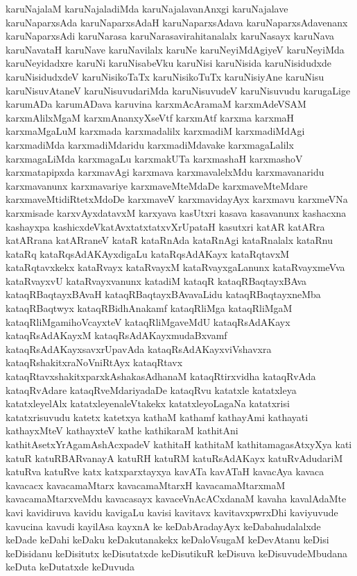 {karuNajalaM
karuNajaladiMda
karuNajalavanAnxgi
karuNajalave
karuNaparxsAda
karuNaparxsAdaH
karuNaparxsAdava
karuNaparxsAdavenanx
karuNaparxsAdi
karuNarasa
karuNarasavirahitanalalx
karuNasayx
karuNava
karuNavataH
karuNave
karuNavilalx
karuNe
karuNeyiMdAgiyeV
karuNeyiMda
karuNeyidadxre
karuNi
karuNisabeVku
karuNisi
karuNisida
karuNisidudxde
karuNisidudxdeV
karuNisikoTaTx
karuNisikoTuTx
karuNisiyAne
karuNisu
karuNisuvAtaneV
karuNisuvudariMda
karuNisuvudeV
karuNisuvudu
karugaLige
karumADa
karumADava
karuvina
karxmAcAramaM
karxmAdeVSAM
karxmAlilxMgaM
karxmAnanxyXseVtf
karxmAtf
karxma
karxmaH
karxmaMgaLuM
karxmada
karxmadalilx
karxmadiM
karxmadiMdAgi
karxmadiMda
karxmadiMdaridu
karxmadiMdavake
karxmagaLalilx
karxmagaLiMda
karxmagaLu
karxmakUTa
karxmashaH
karxmashoV
karxmatapipxda
karxmavAgi
karxmava
karxmavalelxMdu
karxmavanaridu
karxmavanunx
karxmavariye
karxmaveMteMdaDe
karxmaveMteMdare
karxmaveMtidiRtetxMdoDe
karxmaveV
karxmavidayAyx
karxmavu
karxmeVNa
karxmisade
karxvAyxdatavxM
karxyava
kasUtxri
kasava
kasavanunx
kashacxna
kashayxpa
kashicxdeVkatAvxtatxtatxvXrUpataH
kasutxri
katAR
katARra
katARrana
katARraneV
kataR
kataRnAda
kataRnAgi
kataRnalalx
kataRnu
kataRq
kataRqsAdAKAyxdigaLu
kataRqsAdAKayx
kataRqtavxM
kataRqtavxkekx
kataRvayx
kataRvayxM
kataRvayxgaLanunx
kataRvayxmeVva
kataRvayxvU
kataRvayxvanunx
katadiM
kataqR
kataqRBaqtayxBAva
kataqRBaqtayxBAvaH
kataqRBaqtayxBAvavaLidu
kataqRBaqtayxneMba
kataqRBaqtwyx
kataqRBidhAnakamf
kataqRliMga
kataqRliMgaM
kataqRliMgamihoVcayxteV
kataqRliMgaveMdU
kataqRsAdAKayx
kataqRsAdAKayxM
kataqRsAdAKayxmudaBxvamf
kataqRsAdAKayxsavxrUpavAda
kataqRsAdAKayxviVshavxra
kataqRshakitxraNoVniRtAyx
kataqRtavx
kataqRtavxshakitxparxkAshakasAdhanaM
kataqRtirxvidha
kataqRvAda
kataqRvAdare
kataqRveMdariyadaDe
kataqRvu
katatxle
katatxleya
katatxleyelAlx
katatxleyenaleVtakekx
katatxleyoLagaNa
katatxrisi
katatxrisuvudu
katetx
katetxya
kathaM
kathamf
kathayAmi
kathayati
kathayxMteV
kathayxteV
kathe
kathikaraM
kathitAni
kathitAsetxYrAgamAshAcxpadeV
kathitaH
kathitaM
kathitamagasAtxyXya
kati
katuR
katuRBARvanayA
katuRH
katuRM
katuRsAdAKayx
katuRvAdudariM
katuRva
katuRve
katx
katxparxtayxya
kavATa
kavATaH
kavacAya
kavaca
kavacacx
kavacamaMtarx
kavacamaMtarxH
kavacamaMtarxmaM
kavacamaMtarxveMdu
kavacasayx
kavaceVnAcACxdanaM
kavaha
kavalAdaMte
kavi
kavidiruva
kavidu
kavigaLu
kavisi
kavitavx
kavitavxpwrxDhi
kaviyuvude
kavucina
kavudi
kayilAsa
kayxnA
ke
keDabAradayAyx
keDabahudalalxde
keDade
keDahi
keDaku
keDakutanakekx
keDaloVsugaM
keDevAtanu
keDisi
keDisidanu
keDisitutx
keDisutatxde
keDisutikuR
keDisuva
keDisuvudeMbudana
keDuta
keDutatxde
keDuvuda
}
